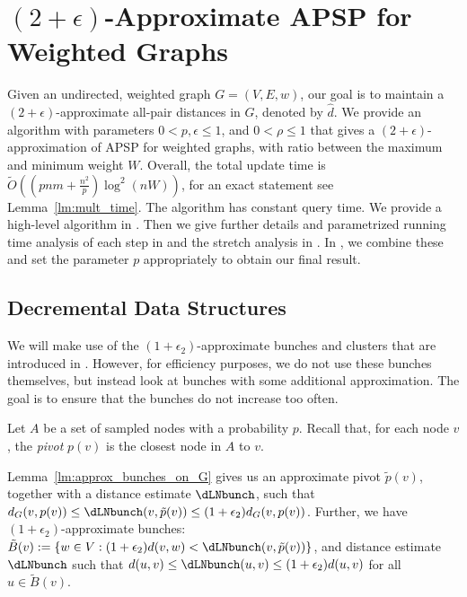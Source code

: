 \section{\texorpdfstring{$(2+\epsilon)$}{(2+epsilon)}-Approximate APSP for Weighted Graphs}\label{sec:TZ_2+eps}
Given an undirected, weighted graph $G=(V,E,w)$, our goal is to maintain a $(2+\epsilon)$-approximate all-pair distances in $G$, denoted by $\hat{d}$. 
We provide an algorithm \DynAPSPtwo with parameters $ 0< p,\epsilon\leq 1 $, and $0< \rho \leq 1$ that gives a $(2+\epsilon)$-approximation of APSP for weighted graphs, with ratio between the maximum and minimum weight $W$. Overall, the total update time is $\tilde{O}((pnm + \tfrac{n^2}{p}) \log^2 (nW))$, for an exact statement see Lemma~\ref{lm:mult_time}. The algorithm has constant query time. We provide a high-level algorithm in . Then we give further details and parametrized running time analysis of each step in  and the stretch analysis in . In , we combine these and set the parameter $p$ appropriately to obtain our final result. 
 


    
\subsection{Decremental Data Structures}\label{sc:mult_alg}

We will make use of the $(1+\epsilon_2)$-approximate bunches and clusters that are introduced in . However, for efficiency purposes, we do not use these bunches themselves, but instead look at bunches with some additional approximation. The goal is to ensure that the bunches do not increase too often. 

Let $A$ be a set of sampled nodes with a probability $p$. Recall that, for each node $v$, the \emph{pivot} $p(v)$ is the closest node in $A$ to $v$.

Lemma~\ref{lm:approx_bunches_on_G} gives us an approximate pivot $\tilde p(v)$, together with a distance estimate $\dLNbunch$, such that $d_G(v,p(v)) \leq \dLNbunch(v,\tilde{p}(v)) \leq (1+\epsilon_2) d_G(v,p(v))$. Further, we have $(1+\epsilon_2)$-approximate bunches: $\tilde B(v) := \{w\in V : (1+\epsilon_2)d(v,w) < \dLNbunch(v,\tilde p(v))\}$, and distance estimate $\dLNbunch$ such that $d(u,v)\leq \dLNbunch(u,v)\leq (1+\epsilon_2)d(u,v)$ for all $u\in \tilde B(v)$.


